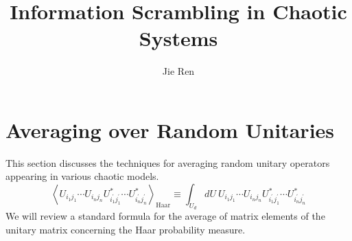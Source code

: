 \documentclass[aps,prb,superscriptaddress,nofootinbib]{revtex4}
\begin{document}
\title{Information Scrambling in Chaotic Systems}
\author{Jie Ren}



\maketitle


\tableofcontents


\section{Averaging over Random Unitaries}

This section discusses the techniques for averaging random unitary operators appearing in various chaotic models.
\begin{equation}
	\left\langle U_{i_1 j_1} \cdots U_{i_n j_n} U_{i_1^{\prime} j_1^{\prime}}^* \cdots U_{i_n^{\prime} j_n^{\prime}}^* \right\rangle_\text{Haar}
	\equiv \int_{U_d} dU \ U_{i_1 j_1} \cdots U_{i_n j_n} U_{i_1^{\prime} j_1^{\prime}}^* \cdots U_{i_n^{\prime} j_n^{\prime}}^*
\end{equation}
We will review a standard formula for the average of matrix elements of the unitary matrix concerning the Haar probability measure.
\end{document}

